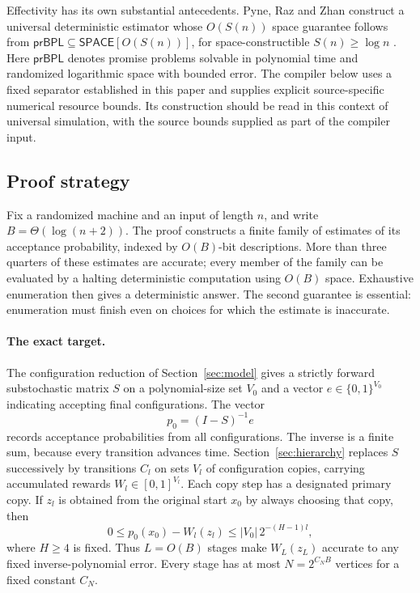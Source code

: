 Effectivity has its own substantial antecedents.
Pyne, Raz and Zhan construct a universal deterministic estimator whose
$O(S(n))$ space guarantee follows from
$\mathsf{prBPL}\subseteq\mathsf{SPACE}[O(S(n))]$, for
space-constructible $S(n)\ge\log n$
\cite[full version, Theorem~5.1]{PyneRazZhan2023}.
Here $\mathsf{prBPL}$ denotes promise problems solvable in polynomial
time and randomized logarithmic space with bounded error.
The compiler below uses a fixed separator established in this paper
and supplies explicit source-specific numerical resource bounds.
Its construction should be read in this context of universal
simulation, with the source bounds supplied as part of the compiler input.

\subsection{Proof strategy}

Fix a randomized machine and an input of length $n$, and write
$B=\Theta(\log(n+2))$.  The proof constructs a finite family of estimates of its
acceptance probability, indexed by $O(B)$-bit descriptions.  More than
three quarters of these estimates are accurate;
every member of the family can be evaluated by a halting deterministic computation
using $O(B)$ space.  Exhaustive enumeration then gives a deterministic
answer.  The second guarantee is essential: enumeration must finish even on choices
for which the estimate is inaccurate.

\paragraph{The exact target.}
The configuration reduction of Section~\ref{sec:model} gives a strictly
forward substochastic matrix $S$ on a polynomial-size set $V_0$ and a
vector $e\in\{0,1\}^{V_0}$ indicating accepting final configurations.
The vector
\[
                         p_0=(I-S)^{-1}e
\]
records acceptance probabilities from all configurations.  The inverse
is a finite sum, because every transition advances time.
Section~\ref{sec:hierarchy} replaces $S$ successively by transitions
$C_l$ on sets $V_l$ of configuration copies, carrying accumulated
rewards $W_l\in[0,1]^{V_l}$.  Each copy step has a designated primary
copy.  If $z_l$ is obtained from the original start $x_0$ by always
choosing that copy, then
\[
       0\le p_0(x_0)-W_l(z_l)
                    \le |V_0|\,2^{-(H-1)l},
\]
where $H\ge4$ is fixed.  Thus $L=O(B)$ stages make $W_L(z_L)$ accurate
to any fixed inverse-polynomial error.  Every stage has at most
$N=2^{C_NB}$ vertices for a fixed constant $C_N$.

